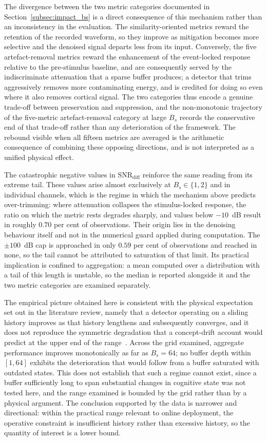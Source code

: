 \documentclass[MScCS,12pt,oneside,final]{uccthesis}
\begin{document}
The divergence between the two metric categories documented in
Section~\ref{subsec:impact_bs} is a direct consequence of this mechanism rather than an inconsistency in the evaluation. The similarity-oriented metrics reward the retention of the recorded waveform, so they improve as mitigation becomes more selective and the denoised signal departs less from its input. Conversely, the five artefact-removal metrics reward the enhancement of the event-locked response relative to the pre-stimulus baseline, and are consequently served by the indiscriminate attenuation that a sparse buffer produces; a detector that trims aggressively removes more contaminating energy, and is credited for doing so even where it also removes cortical signal. The two categories thus encode a genuine trade-off between preservation and suppression, and the non-monotonic trajectory of the five-metric artefact-removal category at large $B_s$ records the conservative end of that trade-off rather than any deterioration of the framework. The rebound visible when all fifteen metrics are averaged is the arithmetic consequence of combining these opposing directions, and is not interpreted as a unified physical effect.

The catastrophic negative values in $\mathrm{SNR}_{\mathrm{diff}}$ reinforce the same reading from its extreme tail. These values arise almost exclusively at $B_s \in \{1, 2\}$ and in individual channels, which is the regime in which the mechanism above predicts over-trimming: where attenuation collapses the stimulus-locked response, the ratio on which the metric rests degrades sharply, and values below $-10$~dB result in roughly $0.70$ per cent of observations. Their origin lies in the denoising behaviour itself and not in the numerical guard applied during computation. The $\pm 100$~dB cap is approached in only $0.59$ per cent of observations and reached in none, so the tail cannot be attributed to saturation of that limit. Its practical implication is confined to aggregation: a mean computed over a distribution with a tail of this length is unstable, so the median is reported alongside it and the two metric categories are examined separately.

The empirical picture obtained here is consistent with the physical expectation set out in the literature review, namely that a detector operating on a sliding history improves as that history lengthens and subsequently converges, and it does not reproduce the symmetric degradation that a concept-drift account would predict at the upper end of the range~\parencite{gama2014survey, longo2025oneegwavelad}. Across the grid examined, aggregate performance improves monotonically as far as $B_s = 64$; no buffer depth within $[1, 64]$ exhibits the deterioration that would follow from a buffer saturated with outdated states. This does not establish that such a regime cannot exist, since a buffer sufficiently long to span substantial changes in cognitive state was not tested here, and the range examined is bounded by the grid rather than by a physical argument. The conclusion supported by the data is narrower and directional: within the practical range relevant to online deployment, the operative constraint is insufficient history rather than excessive history, so the quantity of interest is a lower bound.
\end{document}

